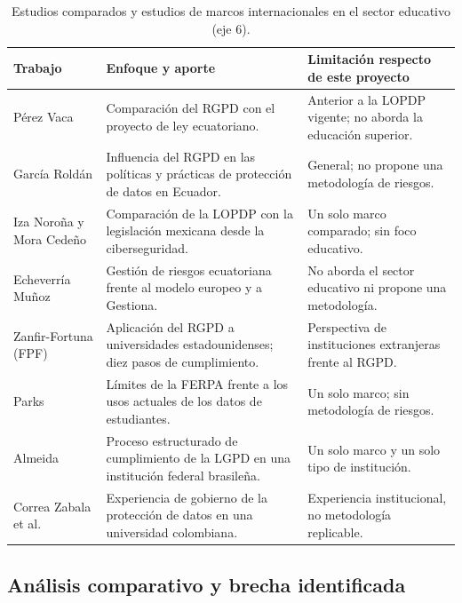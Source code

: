\begin{table}[htbp]
  \centering
  \caption{Estudios comparados y estudios de marcos internacionales en el sector educativo (eje 6).}
  \label{tab:estado_arte3}
  \footnotesize
  \begin{tabularx}{\textwidth}{|p{3.0cm}|L|L|}
    \hline
    \textbf{Trabajo} & \textbf{Enfoque y aporte} & \textbf{Limitación respecto de este proyecto} \\
    \hline
    Pérez Vaca \cite{perezvaca2021} & Comparación del RGPD con el proyecto de ley ecuatoriano. & Anterior a la LOPDP vigente; no aborda la educación superior. \\ \hline
    García Roldán \cite{garcia2024rgpd} & Influencia del RGPD en las políticas y prácticas de protección de datos en Ecuador. & General; no propone una metodología de riesgos. \\ \hline
    Iza Noroña y Mora Cedeño \cite{iza2023lopdp} & Comparación de la LOPDP con la legislación mexicana desde la ciberseguridad. & Un solo marco comparado; sin foco educativo. \\ \hline
    Echeverría Muñoz \cite{echeverria2026riesgos} & Gestión de riesgos ecuatoriana frente al modelo europeo y a Gestiona. & No aborda el sector educativo ni propone una metodología. \\ \hline
    Zanfir-Fortuna (FPF) \cite{fpf2020gdpr} & Aplicación del RGPD a universidades estadounidenses; diez pasos de cumplimiento. & Perspectiva de instituciones extranjeras frente al RGPD. \\ \hline
    Parks \cite{parks2017ferpa} & Límites de la FERPA frente a los usos actuales de los datos de estudiantes. & Un solo marco; sin metodología de riesgos. \\ \hline
    Almeida \cite{almeida2024lgpd} & Proceso estructurado de cumplimiento de la LGPD en una institución federal brasileña. & Un solo marco y un solo tipo de institución. \\ \hline
    Correa Zabala et al. \cite{correa2024rosario} & Experiencia de gobierno de la protección de datos en una universidad colombiana. & Experiencia institucional, no metodología replicable. \\ \hline
  \end{tabularx}
  \raggedright
\end{table}

\subsection{Análisis comparativo y brecha identificada}


